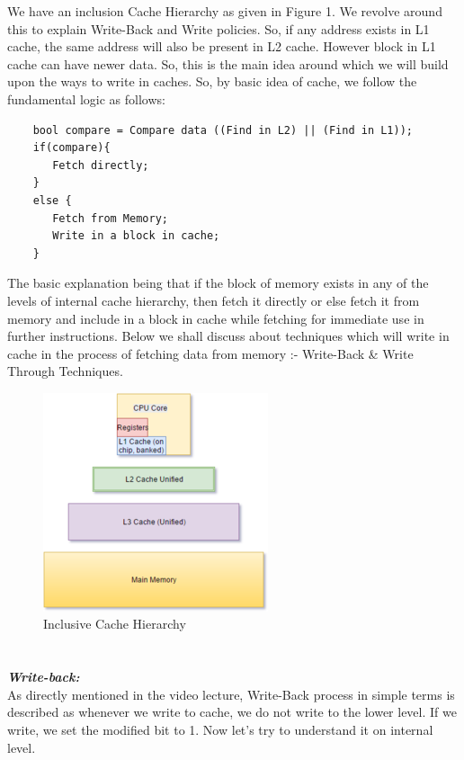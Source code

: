 \documentclass[12pt]{article}
\begin{document}
\maketitle

We have an inclusion Cache Hierarchy as given in Figure 1. We revolve around this to explain Write-Back and Write policies. So, if any address exists in L1 cache, the same address will also be present in L2 cache. However block in L1 cache can have newer data. So, this is the main idea around which we will build upon the ways to write in caches. So, by basic idea of cache, we follow the fundamental logic as follows:
\begin{verbatim}
    bool compare = Compare data ((Find in L2) || (Find in L1));
    if(compare){
       Fetch directly;
    }
    else {
       Fetch from Memory;
       Write in a block in cache;
    }
\end{verbatim}

The basic explanation being that if the block of memory exists in any of the levels of internal cache hierarchy, then fetch it directly or else fetch it from memory and include in a block in cache while fetching for immediate use in further instructions. Below we shall discuss about techniques which will write in cache in the process of fetching data from memory :- Write-Back \& Write Through Techniques.


\begin{figure}
    \centering
    \includegraphics{Assignment-10/Cache_Hierarchy_Updated.png}
    \caption{Inclusive Cache Hierarchy}
\end{figure}


\section{}
\textbf{\textit{Write-back:}} \\
As directly mentioned in the video lecture, Write-Back process in simple terms is described as whenever we write to cache, we do not write to the lower level. If we write, we set the modified bit to 1. Now let's try to understand it on internal level.
\end{document}
